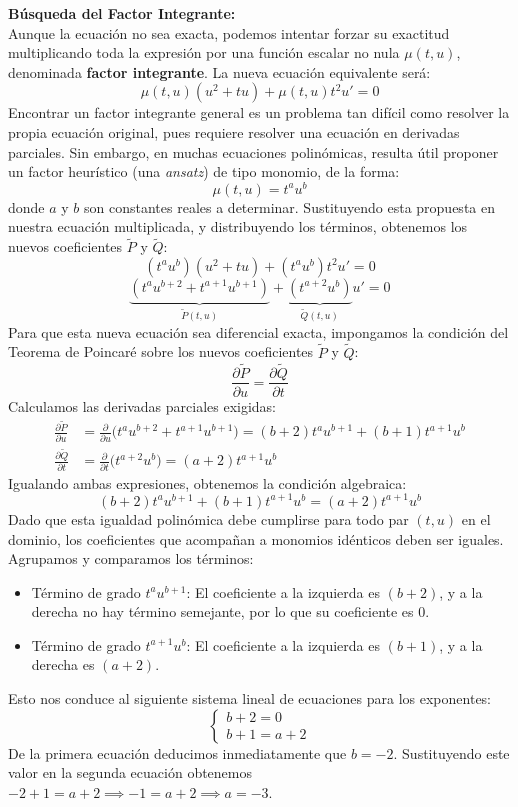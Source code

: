 {    \textbf{Búsqueda del Factor Integrante:} \\
    Aunque la ecuación no sea exacta, podemos intentar forzar su exactitud multiplicando toda la expresión por una función escalar no nula $\mu(t,u)$, denominada \textbf{factor integrante}. La nueva ecuación equivalente será:
    \[
        \mu(t,u)(u^2 + tu) + \mu(t,u)t^2 u' = 0
    \]
    Encontrar un factor integrante general es un problema tan difícil como resolver la propia ecuación original, pues requiere resolver una ecuación en derivadas parciales. Sin embargo, en muchas ecuaciones polinómicas, resulta útil proponer un factor heurístico (una \textit{ansatz}) de tipo monomio, de la forma:
    \[ 
        \mu(t,u) = t^a u^b 
    \]
    donde $a$ y $b$ son constantes reales a determinar. Sustituyendo esta propuesta en nuestra ecuación multiplicada, y distribuyendo los términos, obtenemos los nuevos coeficientes $\tilde{P}$ y $\tilde{Q}$:
    \[
        (t^a u^b)(u^2 + tu) + (t^a u^b)t^2 u' = 0
    \]
    \[
        \underbrace{(t^a u^{b+2} + t^{a+1} u^{b+1})}_{\tilde{P}(t,u)} + \underbrace{(t^{a+2} u^b)}_{\tilde{Q}(t,u)} u' = 0    
    \]
    Para que esta nueva ecuación sea diferencial exacta, impongamos la condición del Teorema de Poincaré sobre los nuevos coeficientes $\tilde{P}$ y $\tilde{Q}$:
    \[
        \frac{\partial \tilde{P}}{\partial u} = \frac{\partial \tilde{Q}}{\partial t}
    \]
    Calculamos las derivadas parciales exigidas:
    \begin{align*}
        \frac{\partial \tilde{P}}{\partial u} &= \frac{\partial}{\partial u} \Big( t^a u^{b+2} + t^{a+1} u^{b+1} \Big) = (b+2) t^a u^{b+1} + (b+1) t^{a+1} u^b \\
        \frac{\partial \tilde{Q}}{\partial t} &= \frac{\partial}{\partial t} \Big( t^{a+2} u^b \Big) = (a+2) t^{a+1} u^b
    \end{align*}
    Igualando ambas expresiones, obtenemos la condición algebraica:
    \[
        (b+2) t^a u^{b+1} + (b+1) t^{a+1} u^b = (a+2) t^{a+1} u^b
    \]
    Dado que esta igualdad polinómica debe cumplirse para todo par $(t,u)$ en el dominio, los coeficientes que acompañan a monomios idénticos deben ser iguales. Agrupamos y comparamos los términos:
    \begin{itemize}
        \item Término de grado $t^a u^{b+1}$: El coeficiente a la izquierda es $(b+2)$, y a la derecha no hay término semejante, por lo que su coeficiente es $0$.
        \item Término de grado $t^{a+1} u^b$: El coeficiente a la izquierda es $(b+1)$, y a la derecha es $(a+2)$.
    \end{itemize}
    Esto nos conduce al siguiente sistema lineal de ecuaciones para los exponentes:
    \[
        \begin{cases}
            b + 2 = 0 \\
            b + 1 = a + 2
        \end{cases}
    \]
    De la primera ecuación deducimos inmediatamente que $b = -2$. Sustituyendo este valor en la segunda ecuación obtenemos $-2 + 1 = a + 2 \implies -1 = a + 2 \implies a = -3$.
    
}
